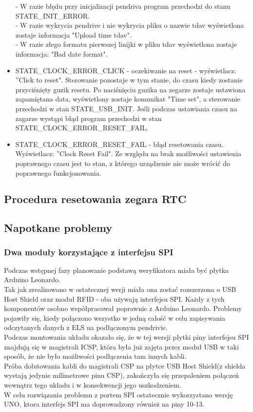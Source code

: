 \documentclass[declaration,shortabstract, mgr]{iithesis}
\begin{document}
\begin{itemize}
- W razie błędu przy inicjalizacji pendriva program przechodzi do stanu STATE\_INIT\_ERROR. \\
- W razie wykrycia pendrive i nie wykrycia pliku o nazwie tdav wyświetlona zostaje informacja "Upload time tdav".\\
- W razie złego formatu pierwszej linijki w pliku tdav wyświetlona zostaje informacja: "Bad date format".
\item STATE\_CLOCK\_ERROR\_CLICK - oczekiwanie na reset - wyświetlacz: ''Click to reset". Sterowanie pozostaje w tym stanie, do czasu kiedy zostanie przyciśnięty guzik resetu. Po naciśnięciu guzika na zegarze zostaje ustawiona zapamiętana data, wyświetlony zostaje komunikat "Time set", a sterowanie przechodzi w stan STATE\_USB\_INIT. Jeśli podczas ustawiania czasu na zagarze wystąpi błąd program przechodzi w stan STATE\_CLOCK\_ERROR\_RESET\_FAIL.
\item STATE\_CLOCK\_ERROR\_RESET\_FAIL - błąd resetowania czasu. Wyświetlacz: ''Clock Reset Fail". Ze względu na brak możliwości ustawienia poprawnego czasu jest to stan, z którego urządzenie nie może wrócić do poprawnego funkcjonowania.
\end{itemize}
\subsection{Procedura resetowania zegara RTC}

\subsection{Napotkane problemy}
\subsubsection{Dwa moduły korzystające z interfejsu SPI}
\indent Podczas wstępnej fazy planowanie podstawą weryfikatora miała być płytka Arduino Leonardo. \\
\indent Tak jak zrealizowano w ostatecznej werji miała ona zostać rozszerzona o USB Host Shield oraz moduł RFID - oba używają interfejsu SPI. Każdy z tych komponentów osobno współpracował poprawnie z Arduino Leonardo. Problemy pojawiły się, kiedy połączono wszystko w jedną całość w celu zapisywania odczytanych danych z ELS na podłączonym pendrivie. \\
\indent Podczas montowania układu okazało się, że w tej wersji płytki piny interfejsu SPI znajdują się w magistrali ICSP, która była już zajęta przez moduł USB w taki sposób, że nie było możliwości podłączenia tam innych kabli. \\
\indent Próba dolutowania kabli do magistrali CSP na płytce USB Host Shield(z shielda wystają jedynie milimetrowe pinu CSP), zakończyła się przepaleniem połączeń wewnątrz tego układu i w konsekwencji jego uszkodzeniem. \\
\indent W celu rozwiązania problemu z portem SPI ostatecznie wykorzystano wersję UNO, ktora interfejs SPI ma doprowadzony również na piny 10-13. \\
\end{document}
